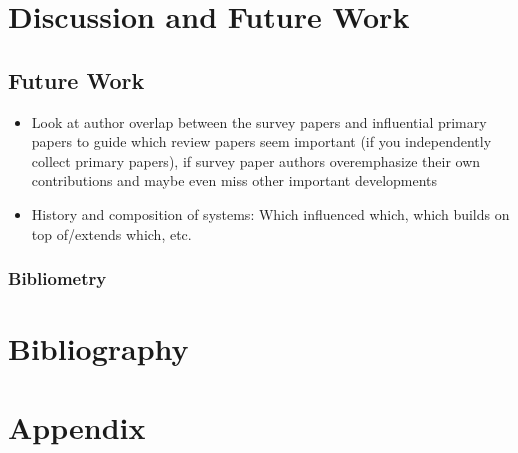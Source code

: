 \documentclass{article}
\begin{document}
\begin{multicols}{2}
    \section{Discussion and Future Work}
    \label{Discussion}
    \subsection{Future Work}
    \begin{itemize}
        \item Look at author overlap between the survey papers and influential primary papers to guide which review papers seem important (if you independently collect primary papers), if survey paper authors overemphasize their own contributions and maybe even miss other important developments
        \item History and composition of systems: Which influenced which, which builds on top of/extends which, etc.
    \end{itemize}

    \subsubsection{Bibliometry}

    \newpage
    \section*{Bibliography}

    \printbibliography

    \renewcommand{\thesubsection}{\arabic{subsection}}
    \renewcommand{\thesubsubsection}{\arabic{subsection}.\arabic{subsubsection}}
    \setcounter{subsection}{0}
    \setcounter{subsubsection}{0}
    \section*{Appendix}


\end{multicols}
\end{document}
